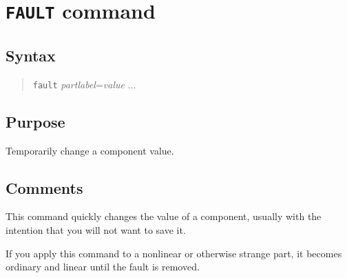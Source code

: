 %
%
%
%
\section{{\tt FAULT} command}
\subsection{Syntax}
\begin{verse}
{\tt fault} {\it partlabel}={\it value} ...
\end{verse}
\subsection{Purpose}

Temporarily change a component value.
\subsection{Comments}

This command quickly changes the value of a component, usually with the
intention that you will not want to save it.

If you apply this command to a nonlinear or otherwise strange part, it becomes
ordinary and linear until the fault is removed.

